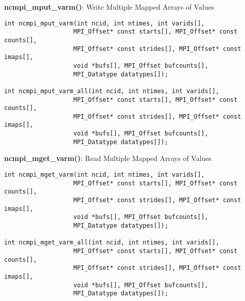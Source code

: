 {\bf ncmpi\_mput\_varm()}: Write Multiple Mapped Arrays of Values

\begin{verbatim}
int ncmpi_mput_varm(int ncid, int ntimes, int varids[],
                   MPI_Offset* const starts[], MPI_Offset* const counts[],
                   MPI_Offset* const strides[], MPI_Offset* const imaps[],
                   void *bufs[], MPI_Offset bufcounts[],
                   MPI_Datatype datatypes[]);

int ncmpi_mput_varm_all(int ncid, int ntimes, int varids[], 
                   MPI_Offset* const starts[], MPI_Offset* const counts[], 
                   MPI_Offset* const strides[], MPI_Offset* const imaps[],
                   void *bufs[], MPI_Offset bufcounts[],
                   MPI_Datatype datatypes[]);
\end{verbatim}


{\bf ncmpi\_mget\_varm()}: Read Multiple Mapped Arrays of Values

\begin{verbatim}
int ncmpi_mget_varm(int ncid, int ntimes, int varids[], 
                   MPI_Offset* const starts[], MPI_Offset* const counts[], 
                   MPI_Offset* const strides[], MPI_Offset* const imaps[],
                   void *bufs[], MPI_Offset bufcounts[],
                   MPI_Datatype datatypes[]);

int ncmpi_mget_varm_all(int ncid, int ntimes, int varids[], 
                   MPI_Offset* const starts[], MPI_Offset* const counts[], 
                   MPI_Offset* const strides[], MPI_Offset* const imaps[],
                   void *bufs[], MPI_Offset bufcounts[],
                   MPI_Datatype datatypes[]);
\end{verbatim}
